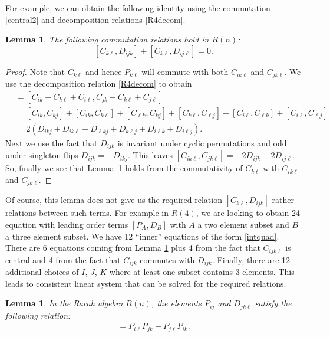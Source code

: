 \documentclass[pdftex]{sigma}
\numberwithin{equation}{section}
\newtheorem{Lemma}[Theorem]{Lemma}
\begin{document}
For example, we can obtain the following identity using the commutation \eqref{central2} and decomposition relations \eqref{R4decom}.
\begin{Lemma}\label{PDcomm}
The following commutation relations hold in $R(n)$:
\[
  [C_{k\ell}, D_{ijk}] +[C_{k\ell} ,D_{ij\ell}]=0.
  \]
\end{Lemma}
\begin{proof}
 Note that $C_{k\ell}$ and hence $P_{k\ell}$ will commute with both $C_{ik\ell}$ and $C_{jk\ell}$. We use the decomposition relation \eqref{R4decom} to obtain
\begin{align*}
[C_{ik\ell}, C_{jk\ell}]&= [C_{ik}+C_{k\ell}+C_{i\ell}, C_{jk} +C_{k\ell}+C_{j\ell}]\\
&= [C_{ik},C_{kj}]+[C_{ik}, C_{k\ell}] + [C_{\ell k}, C_{kj}] + [C_{k\ell}, C_{\ell j}] + [C_{i\ell}, C_{\ell k} ]+[C_{i \ell}, C_{\ell j}]\\
&= 2 ( D_{ikj} + D_{ik\ell} +D_{\ell k j} + D_{k\ell j} +D_{i\ell k} +D_{i\ell j} ).
\end{align*}
Next we use the fact that $D_{ijk}$ is invariant under cyclic permutations and odd under singleton flips $D_{ijk}=-D_{ikj}$. This leaves
$
[C_{ik\ell}, C_{jk\ell}]=-2D_{ijk} -2D_{ij\ell}$.
So, finally we see that Lemma~\ref{PDcomm} holds from the commutativity of $C_{k\ell}$ with $C_{ik\ell}$ and $C_{jk\ell}$.
\end{proof}

Of course, this lemma does not give us the required relation $[C_{k\ell}, D_{ijk}]$ rather relations between such terms. For example in $R(4)$, we are looking to obtain 24 equation with leading order terms $[P_{A}, D_{B}]$ with $A$ a two element subset and $B$ a three element subset. We have 12 ``inner'' equations of the form \eqref{intquad}. There are 6 equations coming from Lemma \ref{PDcomm} plus 4 from the fact that $C_{ijk\ell}$ is central and 4 from the fact that $C_{ijk}$ commutes with $D_{ijk}$. Finally, there are 12 additional choices of $I$, $J$, $K$ where at least one subset contains 3 elements. This leads to consistent linear system that can be solved for the required relations.

\begin{Lemma}\label{outerlemma}
In the Racah algebra $R(n)$, the elements $P_{ij}$ and $D_{jk\ell}$ satisfy the following relation:
\begin{gather}
[P_{ij}, D_{jk\ell}] =P_{i\ell}P_{jk}-P_{j\ell}P_{ik} .\label{outter}
\end{gather}
\end{Lemma}
\end{document}
